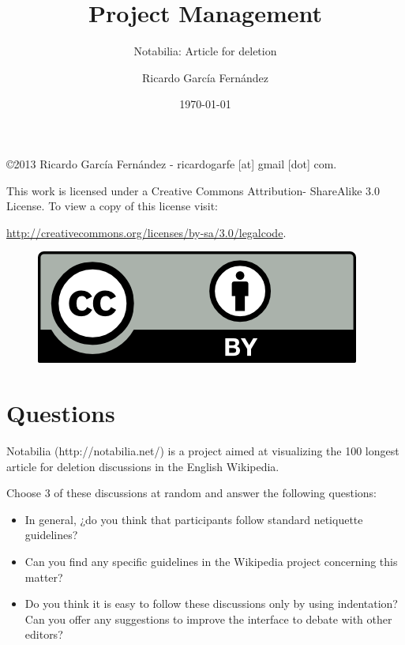 \documentclass[11pt]{scrartcl}
\title{\textbf{Project Management}}
\subtitle{Notabilia: Article for deletion}
\author{Ricardo Garc\'ia Fern\'andez}
\date{\today}
\begin{document}
\maketitle

\vfill

\begin{flushright}
    \copyright  2013 Ricardo Garc\'ia Fern\'andez - ricardogarfe [at] gmail [dot] com.

    This work is licensed under a Creative Commons Attribution- ShareAlike 3.0 License.
    To view a copy of this license visit:
 
    \url{http://creativecommons.org/licenses/by-sa/3.0/legalcode}.
\end{flushright}

\begin{figure}[h]
    \begin{flushright}	
        \includegraphics{by}
        \label{fig:by-sa}
    \end{flushright}
\end{figure}

\newpage

\section{Questions}

Notabilia (http://notabilia.net/) is a project aimed at visualizing the 100 longest article for deletion discussions in the English Wikipedia.

Choose 3 of these discussions at random and answer the following questions:

\begin{itemize}
	\item In general, ¿do you think that participants follow standard netiquette guidelines?
	\item Can you find any specific guidelines in the Wikipedia project concerning this matter?
	\item Do you think it is easy to follow these discussions only by using indentation? Can you offer any suggestions to improve the interface to debate with other editors?
\end{itemize}
\end{document}
